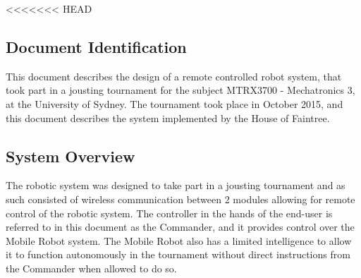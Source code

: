 \documentclass[MTRX3700report.tex]{subfiles}
\begin{document}
<<<<<<< HEAD
\subsection{Document Identification}
  This document describes the design of a remote controlled robot system, that took part in a jousting tournament for the subject MTRX3700 - Mechatronics 3, at the University of Sydney. The tournament took place in October 2015, and this document describes the system implemented by the House of Faintree.
\subsection{System Overview}
  The robotic system was designed to take part in a jousting tournament and as such consisted of wireless communication between 2 modules allowing for remote control of the robotic system. The controller in the hands of the end-user is referred to in this document as the Commander, and it provides control over the Mobile Robot system. The Mobile Robot also has a limited intelligence to allow it to function autonomously in the tournament without direct instructions from the Commander when allowed to do so.
\end{document}
